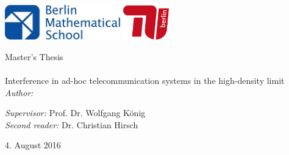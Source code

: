 \documentclass[11pt, english, singlespacing, headsepline, ]{MastersDoctoralThesis}
\author{Adrián Hinojosa Calleja} %
\theoremstyle{definition}
\begin{document}
\frontmatter %

\pagestyle{plain} %


\begin{titlepage}
\centering\includegraphics*[width=5cm]{bms-logo.jpg} \vspace{50pt}\includegraphics*[width=2cm]{tu-logo.jpg} \\

\begin{center}

{\LARGE \univname\par}\vspace{1.5cm} %
\Large Master's Thesis\\[0.5cm] %

\HRule \\[0.4cm] %
\huge
Interference in ad-hoc telecommunication systems in the high-density limit
\vspace{0.4cm} %
\HRule \\[1.5cm] %
 \normalsize
\emph{Author:}\\
{\authorname} %


\vspace{4cm}

\begin{flushleft} 
\emph{Supervisor:} Prof. Dr. Wolfgang König\\
\emph{Second reader:} Dr. Christian Hirsch \\
\end{flushleft} 


\vspace{1cm}
 \facname

{\large 4. August 2016}\\[4cm] %
 
\vfill
\end{center}
\end{titlepage}
\end{document}
